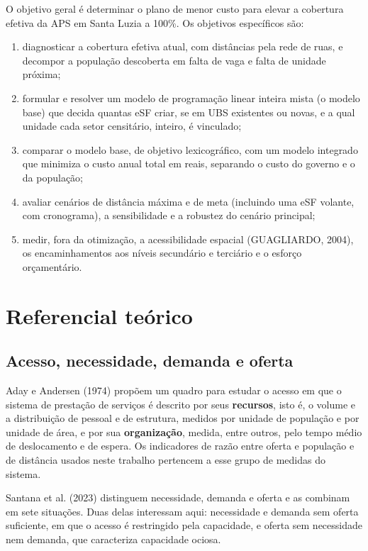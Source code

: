 \documentclass[11pt,a4paper]{article}
\begin{document}
O objetivo geral é determinar o plano de menor custo para elevar a cobertura efetiva da APS em Santa Luzia a 100\%. Os objetivos específicos são:
\begin{enumerate}[label=\alph*),leftmargin=*,itemsep=2pt]
\item diagnosticar a cobertura efetiva atual, com distâncias pela rede de ruas, e decompor a população descoberta em falta de vaga e falta de unidade próxima;
\item formular e resolver um modelo de programação linear inteira mista (o modelo base) que decida quantas eSF criar, se em UBS existentes ou novas, e a qual unidade cada setor censitário, inteiro, é vinculado;
\item comparar o modelo base, de objetivo lexicográfico, com um modelo integrado que minimiza o custo anual total em reais, separando o custo do governo e o da população;
\item avaliar cenários de distância máxima e de meta (incluindo uma eSF volante, com cronograma), a sensibilidade e a robustez do cenário principal;
\item medir, fora da otimização, a acessibilidade espacial (GUAGLIARDO, 2004), os encaminhamentos aos níveis secundário e terciário e o esforço orçamentário.
\end{enumerate}


\section{Referencial teórico}

\subsection{Acesso, necessidade, demanda e oferta}\label{sec:2.1}

Aday e Andersen (1974) propõem um quadro para estudar o acesso em que o sistema de prestação de serviços é descrito por seus \textbf{recursos}, isto é, o volume e a distribuição de pessoal e de estrutura, medidos por unidade de população e por unidade de área, e por sua \textbf{organização}, medida, entre outros, pelo tempo médio de deslocamento e de espera. Os indicadores de razão entre oferta e população e de distância usados neste trabalho pertencem a esse grupo de medidas do sistema.

Santana et al. (2023) distinguem necessidade, demanda e oferta e as combinam em sete situações. Duas delas interessam aqui: necessidade e demanda sem oferta suficiente, em que o acesso é restringido pela capacidade, e oferta sem necessidade nem demanda, que caracteriza capacidade ociosa.
\end{document}
